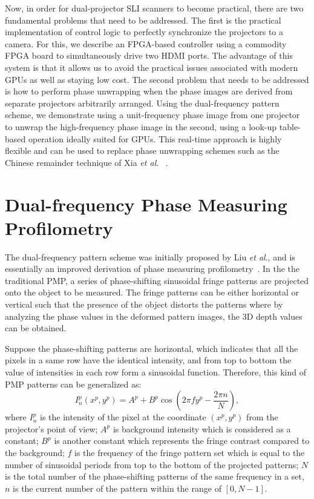 \documentclass[]{spie}  %
\begin{document}
Now, in order for dual-projector SLI scanners to become practical, there are two fundamental problems that need to be addressed.  The first is the practical implementation of control logic to perfectly synchronize the projectors to a camera.  For this, we describe an FPGA-based controller using a commodity FPGA board to simultaneously drive two HDMI ports.  The advantage of this system is that it allows us to avoid the practical issues associated with modern GPUs as well as staying low cost.  The second problem that needs to be addressed is how to perform phase unwrapping when the phase images are derived from separate projectors arbitrarily arranged.  Using the dual-frequency pattern scheme, we demonstrate using a unit-frequency phase image from one projector to unwrap the high-frequency phase image in the second, using a look-up table-based operation ideally suited for GPUs. This real-time approach is highly flexible and can be used to replace phase unwrapping schemes such as the Chinese remainder technique of Xia \textit{et al}. ~\cite{xiax07}.

\section{Dual-frequency Phase Measuring Profilometry}
The dual-frequency pattern scheme was initially proposed by Liu \textit{et al}.\cite{liuk10}, and is essentially an improved derivation of phase measuring profilometry~\cite{hali89}. In the the traditional PMP, a series of phase-shifting sinusoidal fringe patterns are projected onto the object to be measured.  The fringe patterns can be either horizontal or vertical such that the presence of the object distorts the patterns where by analyzing the phase values in the deformed pattern images, the 3D depth values can be obtained.

Suppose the phase-shifting patterns are horizontal, which indicates that all the pixels in a same row have the identical intensity, and from top to bottom the value of intensities in each row form a sinusoidal function. Therefore, this kind of PMP patterns can be generalized as:
\begin{equation} \label{eq:1.1}
I^p_n(x^p, y^p) = A^p + B^p\cos\left(2\pi f y^p - \frac{2\pi n}{N}\right),
\end{equation}
where $I^p_n$ is the intensity of the pixel at the coordinate $(x^p, y^p)$ from the projector's point of view; $A^p$ is background intensity which is considered as a constant; $B^p$ is another constant which represents the fringe contrast compared to the background; $f$ is the frequency of the fringe pattern set which is equal to the number of sinusoidal periods from top to the bottom of the projected patterns; $N$ is the total number of the phase-shifting patterns of the same frequency in a set, $n$ is the current number of the pattern within the range of $[0, N-1]$.
\end{document}
